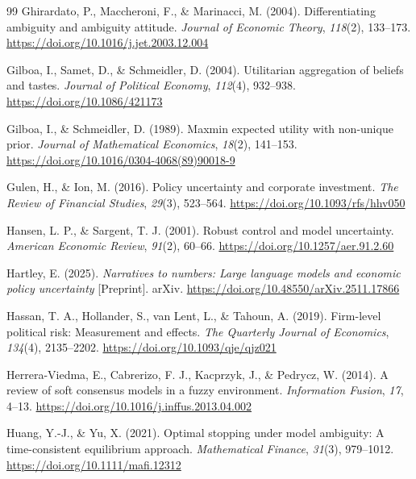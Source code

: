 \documentclass[5p,times,authoryear]{elsarticle}
\theoremstyle{plain}
\begin{document}
\begin{thebibliography}{99}
Ghirardato, P., Maccheroni, F., \& Marinacci, M. (2004). Differentiating ambiguity and ambiguity attitude. \emph{Journal of Economic Theory}, \emph{118}(2), 133--173. \url{https://doi.org/10.1016/j.jet.2003.12.004}

Gilboa, I., Samet, D., \& Schmeidler, D. (2004). Utilitarian aggregation of beliefs and tastes. \emph{Journal of Political Economy}, \emph{112}(4), 932--938. \url{https://doi.org/10.1086/421173}

Gilboa, I., \& Schmeidler, D. (1989). Maxmin expected utility with non-unique prior. \emph{Journal of Mathematical Economics}, \emph{18}(2), 141--153. \url{https://doi.org/10.1016/0304-4068(89)90018-9}

Gulen, H., \& Ion, M. (2016). Policy uncertainty and corporate investment. \emph{The Review of Financial Studies}, \emph{29}(3), 523--564. \url{https://doi.org/10.1093/rfs/hhv050}

Hansen, L. P., \& Sargent, T. J. (2001). Robust control and model uncertainty. \emph{American Economic Review}, \emph{91}(2), 60--66. \url{https://doi.org/10.1257/aer.91.2.60}

Hartley, E. (2025). \emph{Narratives to numbers: Large language models and economic policy uncertainty} [Preprint]. arXiv. \url{https://doi.org/10.48550/arXiv.2511.17866}

Hassan, T. A., Hollander, S., van Lent, L., \& Tahoun, A. (2019). Firm-level political risk: Measurement and effects. \emph{The Quarterly Journal of Economics}, \emph{134}(4), 2135--2202. \url{https://doi.org/10.1093/qje/qjz021}

Herrera-Viedma, E., Cabrerizo, F. J., Kacprzyk, J., \& Pedrycz, W. (2014). A review of soft consensus models in a fuzzy environment. \emph{Information Fusion}, \emph{17}, 4--13. \url{https://doi.org/10.1016/j.inffus.2013.04.002}

Huang, Y.-J., \& Yu, X. (2021). Optimal stopping under model ambiguity: A time-consistent equilibrium approach. \emph{Mathematical Finance}, \emph{31}(3), 979--1012. \url{https://doi.org/10.1111/mafi.12312}


\end{thebibliography}
\end{document}
